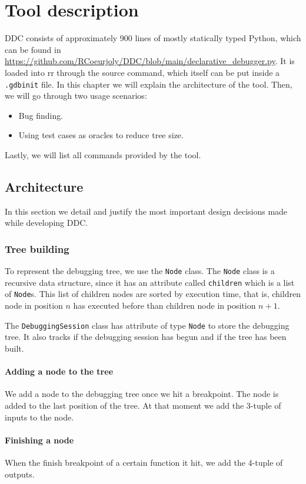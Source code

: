 \chapter{Tool description}
\label{cap:toolDescription}
DDC consists of approximately 900 lines of mostly statically typed Python, which can be found in \url{https://github.com/RCoeurjoly/DDC/blob/main/declarative_debugger.py}.
%
It is loaded into rr through the source command, which itself can be put inside a \verb|.gdbinit| file.
%
In this chapter we will explain the architecture of the tool.
Then, we will go through two usage scenarios:
\begin{itemize}
    \item Bug finding.
    \item Using test cases as oracles to reduce tree size.
\end{itemize}
Lastly, we will list all commands provided by the tool.

\section{Architecture}
In this section we detail and justify the most important design decisions made while developing DDC.
\subsection{Tree building}
To represent the debugging tree, we use the \verb|Node| class. The \verb|Node| class is a recursive data structure, since it has an attribute called \verb|children| which is a list of \verb|Node|s. This list of children nodes are sorted by execution time, that is, children node in position \(n\) has executed before than children node in position \(n+1\).

The \verb|DebuggingSession| class has attribute of type \verb|Node| to store the debugging tree. It also tracks if the debugging session has begun and if the tree has been built.

\subsubsection{Adding a node to the tree}
We add a node to the debugging tree once we hit a breakpoint.
The node is added to the last position of the tree.
At that moment we add the 3-tuple of inputs to the node.
\subsubsection{Finishing a node}
When the finish breakpoint of a certain function it hit, we add the 4-tuple of outputs.
